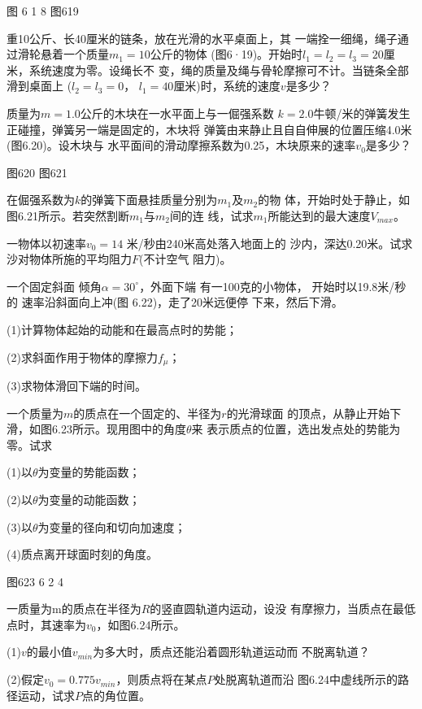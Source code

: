 \begin{exercises}
图 6 1 8 图619

\exercise 重10公斤、长40厘米的链条，放在光滑的水平桌面上，其
一端拴一细绳，绳子通过滑轮悬着一个质量$ m _ { 1 } = 10 $公斤的物体
(图6·19)。开始时$ l _ { 1 } = l _ { 2 } = l _ { 3 } = 20 $厘米，系统速度为零。设绳长不
变，绳的质量及绳与骨轮摩擦可不计。当链条全部滑到桌面上
($ l _ { 2 } = l _ { 3 } = 0 $， $ l _ { 1 } = 40 $厘米)时，系统的速度$ v $是多少？

\exercise 质量为$ m = 1.0 $公斤的木块在一水平面上与一倔强系数
$ k = 2.0 $牛顿/米的弹簧发生正碰撞，弹簧另一端是固定的，木块将
弹簧由来静止且自自伸展的位置压缩4.0米(图6.20)。设木块与
水平面间的滑动摩擦系数为0.25，木块原来的速率$ v _ { 0 } $是多少？

图620 图621

\exercise 在倔强系数为$ k $的弹簧下面悬挂质量分别为$ m_1 $及$ m_2 $的物
体，开始时处于静止，如图6.21所示。若突然割断$ m _ { 1 } $与$ m_2 $间的连
线，试求$ m _ { 1 } $所能达到的最大速度$ V_{max} $。

\exercise 一物体以初速率$ v _ { 0 } = 14 $ 米/秒由240米高处落入地面上的
沙内，深达0.20米。试求沙对物体所施的平均阻力$ F $(不计空气
阻力)。

\exercise 一个固定斜面
倾角$ \alpha = 30 ^ { \circ } $，外面下端
有一100克的小物体，
开始时以19.8米/秒的
速率沿斜面向上冲(图
6.22)，走了20米远便停
下来，然后下滑。

(1)计算物体起始的动能和在最高点时的势能；

(2)求斜面作用于物体的摩擦力$ f _ { \mu } $；

(3)求物体滑回下端的时间。

\exercise 一个质量为$ m $的质点在一个固定的、半径为$ r $的光滑球面
的顶点，从静止开始下滑，如图6.23所示。现用图中的角度$ \theta $来
表示质点的位置，选出发点处的势能为零。试求

(1)以$ \theta $为变量的势能函数；

(2)以$ \theta $为变量的动能函数；

(3)以$ \theta $为变量的径向和切向加速度；

(4)质点离开球面时刻的角度。

图623 6 2 4

\exercise 一质量为m的质点在半径为$ R $的竖直圆轨道内运动，设没
有摩擦力，当质点在最低点时，其速率为$ v_ 0 $，如图6.24所示。

(1)$ v $的最小值$ v _ { min } $为多大时，质点还能沿着圆形轨道运动而
不脱离轨道？

(2)假定$ v _ { 0 } = 0.775 v _ { min } $，则质点将在某点$ P $处脱离轨道而沿
图6.24中虚线所示的路径运动，试求$ P $点的角位置。


\end{exercises}
